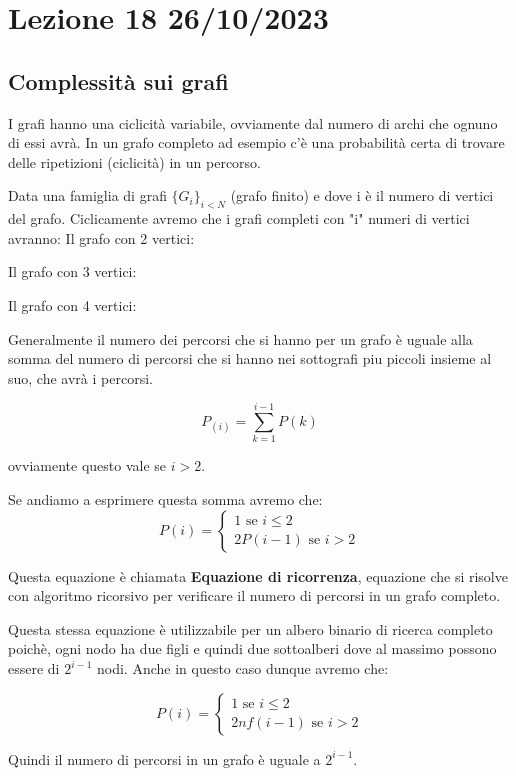\section{Lezione 18 26/10/2023}

\subsection{Complessità sui grafi}
I grafi hanno una ciclicità variabile, ovviamente dal numero di archi che ognuno di essi avrà. In un grafo completo ad esempio c'è una probabilità certa di trovare delle ripetizioni (ciclicità) in un percorso.

Data una famiglia di grafi $\{G_i\}_{i<N}$ (grafo finito) e dove i è il numero di vertici del grafo.
Ciclicamente avremo che i grafi completi con "i" numeri di vertici avranno:
Il grafo con 2 vertici:

Il grafo con 3 vertici:

Il grafo con 4 vertici:

Generalmente il numero dei percorsi che si hanno per un grafo è uguale alla somma del numero di percorsi che si hanno nei sottografi piu piccoli insieme al suo, che avrà i percorsi.


$$P_{(i)} = \sum_{k=1}^{i-1}P(k)$$

ovviamente questo vale se $i>2$.

Se andiamo a esprimere questa somma avremo che:
$$P(i) =  
		\begin{cases}
			1 \text{ se } i\le 2\\
			2P(i-1) \text{ se } i > 2
		\end{cases}$$
		
		Questa equazione è chiamata \textbf{Equazione di ricorrenza}, equazione che si risolve con algoritmo ricorsivo per verificare il numero di percorsi in un grafo completo.

Questa stessa equazione è utilizzabile per un albero binario di ricerca completo poichè, ogni nodo ha due figli e quindi due sottoalberi dove al massimo possono essere di $2^{i-1}$ nodi. Anche in questo caso dunque avremo che:

$$P(i) =  
\begin{cases}
	1 \text{ se } i\le 2\\
	2nf(i-1) \text{ se } i > 2
\end{cases}$$

Quindi il numero di percorsi in un grafo è uguale a $2^{i-1}$.

